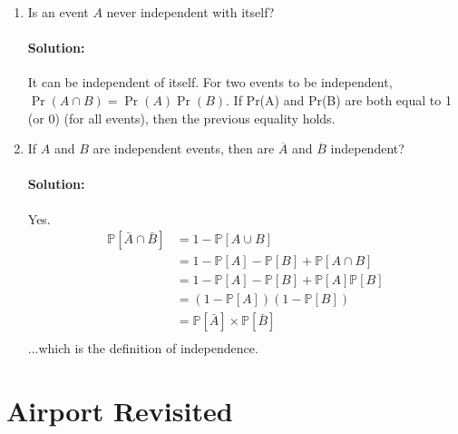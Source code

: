 \documentclass[11pt, notitlepage]{article}
\newcommand{\mP}{\mathbb{P}}
\newcommand{\Question}[1]{\newpage\section{#1}}
\newenvironment{solution}{\paragraph{Solution:}}{\hfill \vspace{10mm}}
\begin{document}
\begin{enumerate}[label=\alph*.)]
\begin{solution}
	\end{solution}
	\item Is an event $A$ never independent with itself?
	\begin{solution}
		It can be independent of itself. For two events to be independent, $\Pr(A \cap B) = \Pr(A) \Pr(B)$. If Pr(A) and Pr(B) are both equal to 1 (or 0) (for all events), then the previous equality holds.
	\end{solution}
	\newpage
	\item If $A$ and $B$ are independent events, then are $\overline{A}$ and $\overline{B}$ independent?
	\begin{solution}
		Yes. 
		\begin{align*}
			\mP[\bar{A}\cap \bar{B}]&=1-\mP[A\cup B] \\
			&= 1-\mP[A]-\mP[B]+\mP[A\cap B]  \\
			&= 	1-\mP[A]-\mP[B]+\mP[A]\mP[B]  \\
			&= 	(1-\mP[A])(1-\mP[B]) \\
			&= 	\mP[\bar A]\times \mP[\bar B] \\
		\end{align*}
		...which is the definition of independence.
	\end{solution}
\end{enumerate}



\Question{Airport Revisited}
\end{document}
